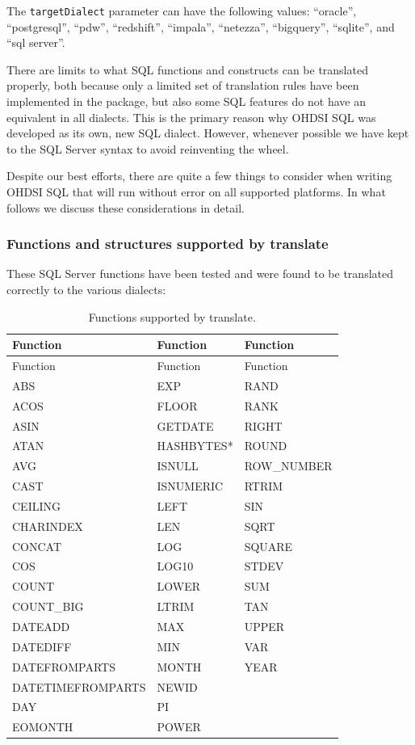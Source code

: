 \documentclass[11pt]{book}
\theoremstyle{definition}
\theoremstyle{definition}
\theoremstyle{definition}
\theoremstyle{remark}
\let\BeginKnitrBlock\begin \let\EndKnitrBlock\end
\begin{document}
The \texttt{targetDialect} parameter can have the following values: ``oracle'', ``postgresql'', ``pdw'', ``redshift'', ``impala'', ``netezza'', ``bigquery'', ``sqlite'', and ``sql server''. 

\BeginKnitrBlock{rmdimportant}
There are limits to what SQL functions and constructs can be translated properly, both because only a limited set of translation rules have been implemented in the package, but also some SQL features do not have an equivalent in all dialects. This is the primary reason why OHDSI SQL was developed as its own, new SQL dialect. However, whenever possible we have kept to the SQL Server syntax to avoid reinventing the wheel.
\EndKnitrBlock{rmdimportant}

Despite our best efforts, there are quite a few things to consider when writing OHDSI SQL that will run without error on all supported platforms. In what follows we discuss these considerations in detail.

\hypertarget{functions-and-structures-supported-by-translate}{%
\subsubsection*{Functions and structures supported by translate}\label{functions-and-structures-supported-by-translate}}

These SQL Server functions have been tested and were found to be translated correctly to the various dialects:

\begin{longtable}[]{@{}lll@{}}
\caption{\label{tab:sqlFunctions} Functions supported by translate.}\tabularnewline
\toprule
Function & Function & Function\tabularnewline
\midrule
\endfirsthead
\toprule
Function & Function & Function\tabularnewline
\midrule
\endhead
ABS & EXP & RAND\tabularnewline
ACOS & FLOOR & RANK\tabularnewline
ASIN & GETDATE & RIGHT\tabularnewline
ATAN & HASHBYTES* & ROUND\tabularnewline
AVG & ISNULL & ROW\_NUMBER\tabularnewline
CAST & ISNUMERIC & RTRIM\tabularnewline
CEILING & LEFT & SIN\tabularnewline
CHARINDEX & LEN & SQRT\tabularnewline
CONCAT & LOG & SQUARE\tabularnewline
COS & LOG10 & STDEV\tabularnewline
COUNT & LOWER & SUM\tabularnewline
COUNT\_BIG & LTRIM & TAN\tabularnewline
DATEADD & MAX & UPPER\tabularnewline
DATEDIFF & MIN & VAR\tabularnewline
DATEFROMPARTS & MONTH & YEAR\tabularnewline
DATETIMEFROMPARTS & NEWID &\tabularnewline
DAY & PI &\tabularnewline
EOMONTH & POWER &\tabularnewline
\bottomrule
\end{longtable}
\end{document}
